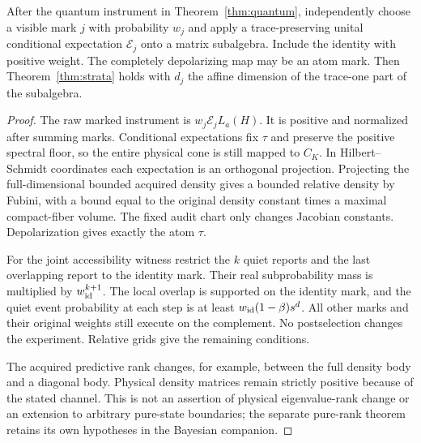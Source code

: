 \begin{corollary}\label{cor:rank}
After the quantum instrument in Theorem~\ref{thm:quantum}, independently choose a visible mark $j$ with probability $w_j$ and apply a trace-preserving unital conditional expectation $\mathcal E_j$ onto a matrix subalgebra. Include the identity with positive weight. The completely depolarizing map may be an atom mark. Then Theorem~\ref{thm:strata} holds with $d_j$ the affine dimension of the trace-one part of the subalgebra.
\end{corollary}
\begin{proof}
The raw marked instrument is $w_j\mathcal E_jL_a(H)$. It is positive and normalized after summing marks. Conditional expectations fix $\tau$ and preserve the positive spectral floor, so the entire physical cone is still mapped to $C_K$. In Hilbert--Schmidt coordinates each expectation is an orthogonal projection. Projecting the full-dimensional bounded acquired density gives a bounded relative density by Fubini, with a bound equal to the original density constant times a maximal compact-fiber volume. The fixed audit chart only changes Jacobian constants. Depolarization gives exactly the atom $\tau$.

For the joint accessibility witness restrict the $k$ quiet reports and the last overlapping report to the identity mark. Their real subprobability mass is multiplied by $w_{\rm id}^{k+1}$. The local overlap is supported on the identity mark, and the quiet event probability at each step is at least $w_{\rm id}(1-\beta)s^d$. All other marks and their original weights still execute on the complement. No postselection changes the experiment. Relative grids give the remaining conditions.

The acquired predictive rank changes, for example, between the full density body and a diagonal body. Physical density matrices remain strictly positive because of the stated channel. This is not an assertion of physical eigenvalue-rank change or an extension to arbitrary pure-state boundaries; the separate pure-rank theorem retains its own hypotheses in the Bayesian companion.
\end{proof}
